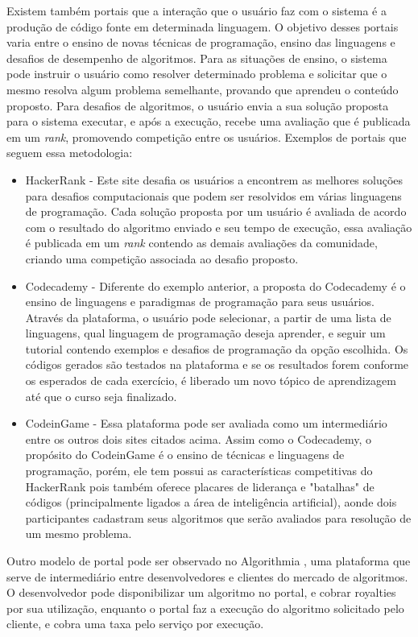 \documentclass[tg]{mdtufsm}
\begin{document}
Existem também portais que a interação que o usuário faz com o sistema é a produção de código fonte em determinada linguagem. O objetivo desses portais varia entre o ensino de novas técnicas de programação, ensino das linguagens e desafios de desempenho de algoritmos. Para as situações de ensino, o sistema pode instruir o usuário como resolver determinado problema e solicitar que o mesmo resolva algum problema semelhante, provando que aprendeu o conteúdo proposto.
Para desafios de algoritmos, o usuário envia a sua solução proposta para o sistema executar, e após a execução, recebe uma avaliação que é publicada em um \emph{rank}, promovendo competição entre os usuários. 
Exemplos de portais que seguem essa metodologia:
\begin{itemize}
	\item HackerRank \cite{hackerrank} - Este site desafia os usuários a encontrem as melhores soluções para desafios computacionais que podem ser resolvidos em várias linguagens de programação. Cada solução proposta por um usuário é avaliada de acordo com o resultado do algoritmo enviado e seu tempo de execução, essa avaliação é publicada em um \emph{rank} contendo as demais avaliações da comunidade, criando uma competição associada ao desafio proposto.
	\item Codecademy \cite{codecademy} - Diferente do exemplo anterior, a proposta do Codecademy é o ensino de linguagens e paradigmas de programação para seus usuários. Através da plataforma, o usuário pode selecionar, a partir de uma lista de linguagens, qual linguagem de programação deseja aprender, e seguir um tutorial contendo exemplos e desafios de programação da opção escolhida.
	Os códigos gerados são testados na plataforma e se os resultados forem conforme os esperados de cada exercício, é liberado um novo tópico de aprendizagem até que o curso seja finalizado.
	\item CodeinGame \cite{codeingame} - Essa plataforma pode ser avaliada como um intermediário entre os outros dois sites citados acima. Assim como o Codecademy, o propósito do CodeinGame é o ensino de técnicas e linguagens de programação, porém, ele tem possui as características competitivas do HackerRank pois também oferece placares de liderança e "batalhas" de códigos (principalmente ligados a área de inteligência artificial), aonde dois participantes cadastram seus algoritmos que serão avaliados para resolução de um mesmo problema.
\end{itemize}

Outro modelo de portal pode ser observado no Algorithmia \cite{algor}, uma plataforma que serve de intermediário entre desenvolvedores e clientes do mercado de algoritmos. O desenvolvedor pode disponibilizar um algoritmo no portal, e cobrar royalties por sua utilização, enquanto o portal faz a execução do algoritmo solicitado pelo cliente, e cobra uma taxa pelo serviço por execução.
\end{document}
